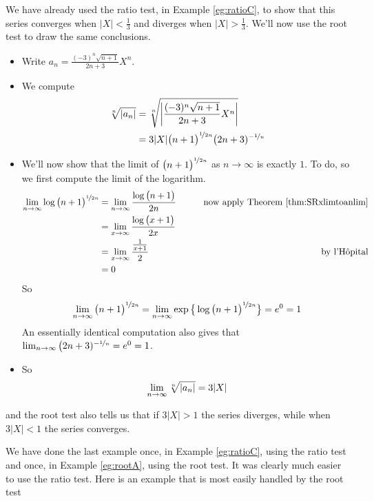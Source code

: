 \begin{eg}[$\sum_{n=1}^\infty \frac{ (-3)^n \sqrt{n+1}}{2n+3}X^n$]
\label{eg:rootA}
 We have already used the ratio test, in Example \ref{eg:ratioC},
to show that this series converges when $|X|<\frac{1}{3}$ and diverges
when $|X|>\frac{1}{3}$. We'll now use the root test to draw the
same conclusions.
 \begin{itemize}
  \item  Write $a_n=  \frac{ (-3)^n \sqrt{n+1}}{2n+3}X^n$.
  \item We compute
 \begin{align*}
  \root{n}\of{|a_n|}
  &= \root{n}\of{ \bigg|\frac{ (-3)^n \sqrt{n+1}}{2n+3}X^n\bigg|}\\
  &= 3 |X|\big(n+1\big)^{\nicefrac{1}{2n}}  \big(2n+3)^{-\nicefrac{1}{n}}
\end{align*}
\item We'll now show that the limit of $\big(n+1\big)^{\nicefrac{1}{2n}}$
as $n\to\infty$ is exactly $1$. To do, so we first compute the limit
of the logarithm.
\begin{align*}
\lim_{n\to\infty}\log \big(n+1\big)^{\nicefrac{1}{2n}}
&=\lim_{n\to\infty}\frac{\log \big(n+1\big)}{2n}
\qquad&\text{now apply Theorem \ref{thm:SRxlimtoanlim}} \\
&=\lim_{x\to\infty}\frac{\log \big(x+1\big)}{2x} \\
&=\lim_{x\to\infty}\frac{\frac{1}{x+1}}{2}
\qquad&\text{by l'H\^opital} \\
&=0
\end{align*}
So
\begin{align*}
\lim_{n\to\infty}\big(n+1\big)^{\nicefrac{1}{2n}}
=\lim_{n\to\infty}\exp\big\{\log \big(n+1\big)^{\nicefrac{1}{2n}}\big\}
= e^0=1
\end{align*}
An essentially identical computation also gives that
$\lim_{n\to\infty}\big(2n+3)^{-\nicefrac{1}{n}} = e^0=1$.
\item So
\begin{align*}
\lim_{n\to\infty}\root{n}\of{|a_n|}
= 3 |X|
\end{align*}
\end{itemize}
and the root test also tells us that if $3|X|>1$ the series diverges,
while when $3|X|<1$ the series converges.
\end{eg}
We have done the last example once, in Example \ref{eg:ratioC},
using the ratio test and once, in Example \ref{eg:rootA},
using the root test. It was clearly much easier to use the ratio test.
Here is an example that is most easily handled by the root test

